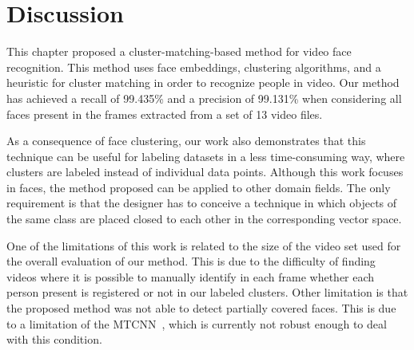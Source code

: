 \section{Discussion}
\label{sec:recognition_discussion}

This chapter proposed a cluster-matching-based method for video face recognition. 
This method uses face embeddings, clustering algorithms, and a heuristic for cluster matching in order to recognize people in video. 
Our method has achieved a recall of 99.435\% and a precision of 99.131\% when considering all faces present in the frames extracted from a set of 13 video files.  

As a consequence of face clustering, our work also demonstrates that this technique can be useful for labeling datasets in a less time-consuming way, where clusters are labeled instead of individual data points.
Although this work focuses in faces, the method proposed can be applied to other domain fields.
The only requirement is that the designer has to  conceive a technique in which objects of the same class are placed closed to each other in the corresponding vector space.

One of the limitations of this work is related to the size of the video set used for the overall evaluation of our method. 
This is due to the difficulty of finding videos where it is possible to manually identify in each frame whether each person present is registered or not in our labeled clusters.
Other limitation is that the proposed method was not able to detect partially covered faces. 
This is due to a limitation of the MTCNN~\cite{mtcnn}, which is currently not robust enough to deal with this condition.
